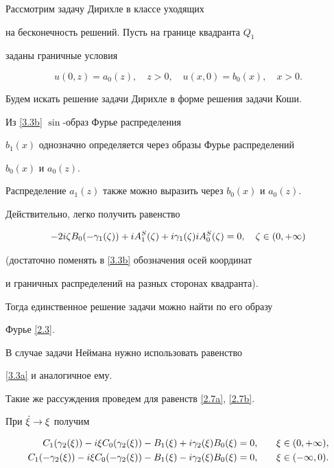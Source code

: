 \begin{pf}


Рассмотрим задачу Дирихле в классе уходящих


на бесконечность решений. Пусть на границе квадранта $Q_1$


заданы граничные условия


$$


u(0,z)=a_0(z),\quad z>0, \quad u(x,0)=b_0(x),\quad x>0 .


$$


Будем искать решение задачи Дирихле в форме решения задачи Коши.


Из \eqref{3.3b} $\sin$-образ Фурье распределения


$b_1(x)$ однозначно определяется через образы Фурье распределений


$b_0(x)$ и $a_0(z)$.





Распределение $a_1(z)$ также можно выразить через $b_0(x)$ и $a_0(z)$.


Действительно, легко получить равенство


$$


-2i\dz B_0(-\gafdz)+iA^S_1(\dz)+i\gafdz iA^S_0(\dz) = 0,\quad


\dz\in(0,+\infty)


$$


(достаточно поменять в \eqref{3.3b} обозначения осей координат


и граничных распределений на разных сторонах квадранта).


Тогда единственное решение задачи можно найти по его образу


Фурье \eqref{2.3}.





В случае задачи Неймана нужно использовать равенство


\eqref{3.3a} и аналогичное ему.


\end{pf}





Такие же рассуждения проведем для равенств \eqref{2.7a}, \eqref{2.7b}.


При $\Dot{\xi}\to\xi$ получим


\begin{alignat}{2}


\label{3.4a}


C_1(\gasxi)-i\xi C_0(\gasxi)


-B_1(\xi)+i\gasxi B_0(\xi)&=0,&\quad \xi&\in(0,+\infty) ,\\


%


\label{3.4b}


C_1(-\gasxi)-i\xi C_0(-\gasxi)


-B_1(\xi)-i\gasxi B_0(\xi) &= 0,&\quad \xi&\in(-\infty,0) .


\end{alignat}


